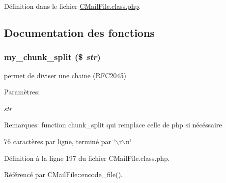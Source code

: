 D\'{e}finition dans le fichier \hyperlink{CMailFile_8class_8php-source}{CMail\-File.class.php}.

\subsection{Documentation des fonctions}
\hypertarget{CMailFile_8class_8php_a0}{
\subsubsection[my\_\-chunk\_\-split]{\setlength{\rightskip}{0pt plus 5cm}my\_\-chunk\_\-split (\$ {\em str})}}
\label{CMailFile_8class_8php_a0}


permet de diviser une chaine (RFC2045) 

\begin{Desc}
\item[Param\`{e}tres:]
\begin{description}
\item[{\em str}]\end{description}
\end{Desc}
\begin{Desc}
\item[Remarques:]function chunk\_\-split qui remplace celle de php si n\'{e}c\'{e}ssaire 

76 caract\`{e}res par ligne, termin\'{e} par \char`\"{}$\backslash$r$\backslash$n\char`\"{} \end{Desc}


D\'{e}finition \`{a} la ligne 197 du fichier CMail\-File.class.php.

R\'{e}f\'{e}renc\'{e} par CMail\-File::encode\_\-file().